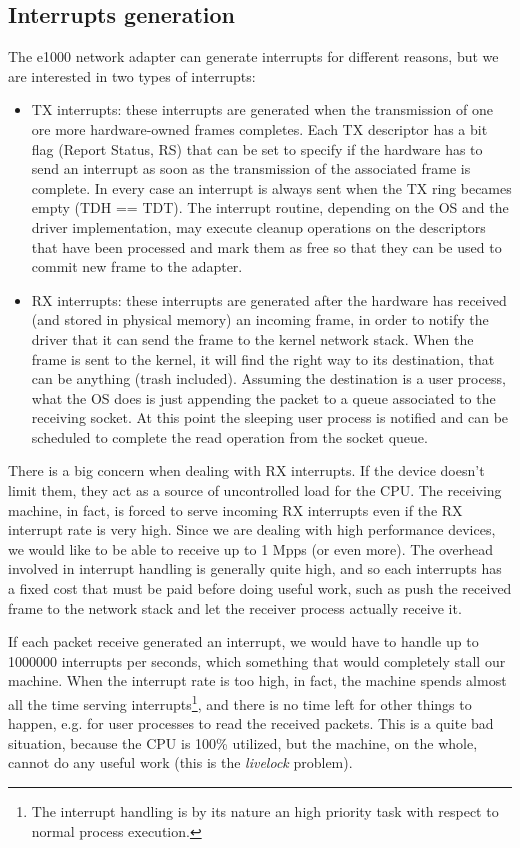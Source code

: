 \subsection{Interrupts generation}
\label{sec:e1000int}
The e1000 network adapter can generate interrupts for different reasons, but we are interested in two types of interrupts:
\begin{itemize}
    \item TX interrupts: these interrupts are generated when the transmission of one ore more hardware-owned frames completes. Each TX 
	  descriptor has
	  a bit flag (Report Status, RS) that can be set to specify if the hardware has to send an interrupt as soon as the transmission 
	  of the associated
	  frame is complete. In every case an interrupt is always sent when the TX ring becames empty (TDH == TDT).
	  The interrupt routine, depending on the OS and the driver implementation, may execute cleanup operations on the descriptors 
	  that have been processed and mark them as free so that they can be used to commit new frame to the adapter.
	      
    \item RX interrupts: these interrupts are generated after the hardware has received (and stored in physical memory) an incoming frame, 
	  in order to notify the driver that it can send the frame to the kernel network stack. When the frame is sent to the kernel, it
	  will find the right way to its destination, that can be anything (trash included). Assuming the destination is a user process,
	  what the OS does is just appending the packet to a queue associated to the receiving socket. At this point the sleeping user
	  process is notified and can be scheduled to complete the read operation from the socket queue.
\end{itemize}

There is a big concern when dealing with RX interrupts. If the device doesn't limit them, they act as a source of uncontrolled load for the 
CPU.
The receiving machine, in fact, is forced to serve incoming RX interrupts even if the RX interrupt rate is very high. Since we are
dealing with high performance devices, we would like to be able to receive up to 1 Mpps (or even more).
The overhead involved in interrupt handling is generally quite high, and so each interrupts has a fixed cost that must be paid before
doing useful work, such as push the received frame to the network stack and let the receiver process actually receive it.

If each packet receive generated an interrupt, we would have to handle up to 1000000 interrupts per seconds, which something that would
completely stall our machine.
When the interrupt rate is too high, in fact, the machine spends almost all the time serving interrupts\footnote{The interrupt handling is
by its nature an high priority task with respect to normal process execution.}, and there is no time left for other things to happen,
e.g. for user processes to read the received packets. This is a quite bad situation, because the CPU is 100\% utilized, but the machine,
on the whole, cannot do any useful work (this is the \emph{livelock} problem).

